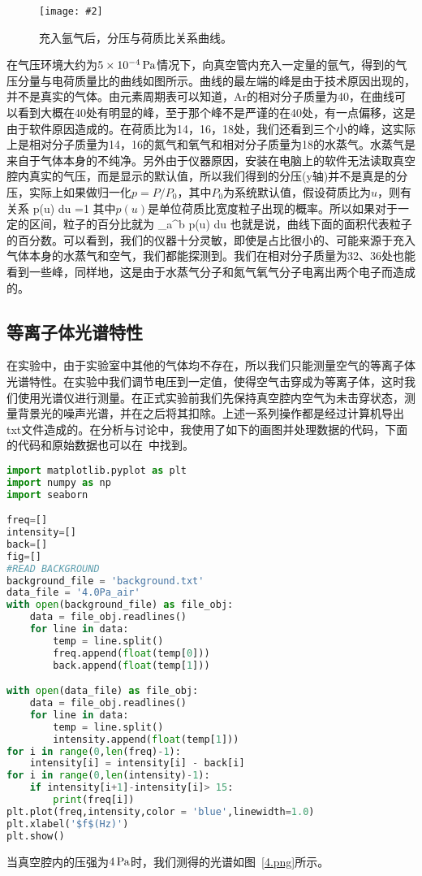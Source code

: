 \documentclass{ctexart}
\newcommand{\cpic}[2]{
\begin{center}
\texttt{[image: \#2]}
\end{center}
}
\newcommand{\cpicn}[3]
{
\begin{figure}[H]
\cpic{#1}{#2}
\caption{#3\label{#2}}
\end{figure}
}
\begin{document}
\cpicn{0.3}{Ar.PNG}{\color{red} 充入氩气后，分压与荷质比关系曲线。}
\par 在气压环境大约为$5\times 10^{-4}\,\mathrm{Pa}$情况下，向真空管内充入一定量的氩气，得到的气压分量与电荷质量比的曲线如图所示。曲线的最左端的峰是由于技术原因出现的，并不是真实的气体。由元素周期表可以知道，Ar的相对分子质量为40，在曲线可以看到大概在40处有明显的峰，至于那个峰不是严谨的在40处，有一点偏移，这是由于软件原因造成的。在荷质比为14，16，18处，我们还看到三个小的峰，这实际上是相对分子质量为14，16的氮气和氧气和相对分子质量为18的水蒸气。水蒸气是来自于气体本身的不纯净。另外由于仪器原因，安装在电脑上的软件无法读取真空腔内真实的气压，而是显示的默认值，所以我们得到的分压(y轴)并不是真是的分压，实际上如果做归一化$p = P/P_0$，其中$P_0$为系统默认值，假设荷质比为$u$，则有关系
\beq
\int p(u) du =1
\eeq
其中$p(u)$是单位荷质比宽度粒子出现的概率。所以如果对于一定的区间，粒子的百分比就为
\beq
\int_a^b p(u) du
\eeq
也就是说，曲线下面的面积代表粒子的百分数。可以看到，我们的仪器十分灵敏，即使是占比很小的、可能来源于充入气体本身的水蒸气和空气，我们都能探测到。我们在相对分子质量为32、36处也能看到一些峰，同样地，这是由于水蒸气分子和氮气氧气分子电离出两个电子而造成的。
\subsection{等离子体光谱特性}
在实验中，由于实验室中其他的气体均不存在，所以我们只能测量空气的等离子体光谱特性。在实验中我们调节电压到一定值，使得空气击穿成为等离子体，这时我们使用光谱仪进行测量。在正式实验前我们先保持真空腔内空气为未击穿状态，测量背景光的噪声光谱，并在之后将其扣除。上述一系列操作都是经过计算机导出txt文件造成的。在分析与讨论中，我使用了如下的画图并处理数据的代码，下面的代码和原始数据也可以在~\cite{git}中找到。
\begin{lstlisting}[language=python,keywordstyle=\color{blue!70},commentstyle=\color{red!50!green!50!blue!50},frame=shadowbox, rulesepcolor=\color{red!20!green!20!blue!20}]
import matplotlib.pyplot as plt
import numpy as np
import seaborn

freq=[]
intensity=[]
back=[]
fig=[]
#READ BACKGROUND
background_file = 'background.txt'
data_file = '4.0Pa_air'
with open(background_file) as file_obj:
    data = file_obj.readlines()
    for line in data:
        temp = line.split()
        freq.append(float(temp[0]))
        back.append(float(temp[1]))

with open(data_file) as file_obj:
    data = file_obj.readlines()
    for line in data:
        temp = line.split()
        intensity.append(float(temp[1]))
for i in range(0,len(freq)-1):
    intensity[i] = intensity[i] - back[i]
for i in range(0,len(intensity)-1):
    if intensity[i+1]-intensity[i]> 15:
        print(freq[i])
plt.plot(freq,intensity,color = 'blue',linewidth=1.0)
plt.xlabel('$f$(Hz)')
plt.show()
\end{lstlisting}
当真空腔内的压强为$4\,\mathrm{Pa}$时，我们测得的光谱如图~\ref{4.png}所示。
\end{document}
